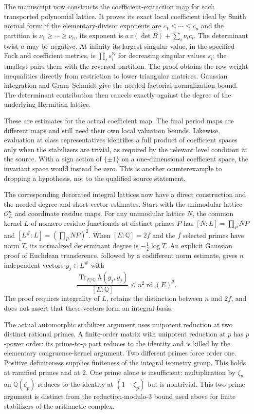 \documentclass[11pt,a4paper]{article}
\theoremstyle{remark}
\newcommand{\Q}{\mathbb Q}
\begin{document}
The manuscript now constructs the coefficient-extraction map for
each transported polynomial lattice. It proves its exact local
coefficient ideal by Smith normal form: if the elementary-divisor
exponents are $c_1\le\cdots\le c_n$ and the partition is
$\nu_1\ge\cdots\ge\nu_n$, its exponent is
$a\,v(\det B)+\sum_i\nu_ic_i$. The determinant twist $a$
may be negative. At infinity its largest singular value, in
the specified Fock and coefficient metrics, is
$\prod_i s_i^{\nu_i}$ for decreasing singular values $s_i$;
the smallest pairs them with the reversed partition.
The proof obtains the row-weight inequalities directly from
restriction to lower triangular matrices. Gaussian integration
and Gram--Schmidt give the needed factorial normalization bound.
The determinant contribution then cancels exactly against the
degree of the underlying Hermitian lattice.

These are estimates for the actual coefficient map. The final
period maps are different maps and still need their own local
valuation bounds. Likewise, evaluation at class representatives
identifies a full product of coefficient spaces only when the
stabilizers are trivial, as required by the relevant level
condition in the source. With a sign action of $\{\pm1\}$
on a one-dimensional coefficient space, the invariant space
would instead be zero. This is another counterexample to
dropping a hypothesis, not to the qualified source statement.

The corresponding decorated integral lattices now have a direct
construction and the needed degree and short-vector estimates.
Start with the unimodular lattice $\mathcal O_E^n$ and coordinate
residue maps. For any unimodular lattice $N$, the common kernel
$L$ of nonzero residue functionals at distinct primes $P$ has
$[N:L]=\prod_P NP$ and $[L^\#:L]=(\prod_P NP)^2$.
When $[E:\Q]=2f$ and the $f$ selected primes have norm $T$,
its normalized determinant degree is $-\tfrac12\log T$.
An explicit Gaussian proof of Euclidean transference, followed
by a codifferent norm estimate, gives $n$ independent vectors
$y_j\in L^\#$ with
\[
 \frac{\operatorname{Tr}_{E/\Q}h(y_j,y_j)}{[E:\Q]}
                      \le n^2\operatorname{rd}(E)^2.
\]
The proof requires integrality of $L$, retains the distinction
between $n$ and $2f$, and does not assert that these vectors form
an integral basis.

The actual automorphic stabilizer argument uses unipotent
reduction at two distinct rational primes. A finite-order
matrix with unipotent reduction at $p$ has $p$-power order:
its prime-to-$p$ part reduces to the identity and is killed
by the elementary congruence-kernel argument. Two different
primes force order one. Positive definiteness supplies finiteness
of the integral isometry group. This holds at ramified primes
and at $2$. One prime alone is insufficient: multiplication
by $\zeta_p$ on $\Q(\zeta_p)$ reduces to the identity at
$(1-\zeta_p)$ but is nontrivial. This two-prime argument is
distinct from the reduction-modulo-$3$ bound used above for
finite stabilizers of the arithmetic complex.
\end{document}
